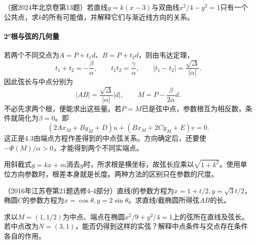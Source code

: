 \par\noindent\begin{minipage}{\linewidth}
\begin{example}
（据2024年北京卷第13题）若直线\(y=k(x-3)\)与双曲线\(x^2/4-y^2=1\)只有一个公共点，求\(k\)的所有可能值，并解释它们与渐近线方向的关系。
\end{example}
\end{minipage}\par


\paragraph{2°根与弦的几何量} \mbox{}

若两个不同交点为\(A=P+t_1d\)、\(B=P+t_2d\)，则由韦达定理，
\begin{equation*}
    t_1+t_2=-\frac\beta\alpha,\qquad
    t_1t_2=\frac\gamma\alpha,\qquad
    |t_1-t_2|=\frac{\sqrt\Delta}{|\alpha|} .
\end{equation*}
因此弦长与中点分别为
\begin{equation}\label{eq:quadratic-chord-length-midpoint}
    |AB|=\frac{\sqrt\Delta}{|\alpha|}|d|,
    \qquad M=P-\frac\beta{2\alpha}d .
\end{equation}
不必先求两个根，便能求出这些量。若\(P=M\)已是弦中点，参数根互为相反数，条件就简化为\(\beta=0\)。即
\begin{equation}\label{eq:quadratic-midpoint-chord-condition}
    (2Ax_M+By_M+D)u+(Bx_M+2Cy_M+E)v=0 .
\end{equation}
这正是4.3由端点方程作差得到的中点弦关系。方向确定后，还要使\(-\Phi(M)/\alpha>0\)，才能得到两个不同实端点。

用斜截式\(y=kx+m\)消去\(y\)时，所求根是横坐标，故弦长应乘以\(\sqrt{1+k^2}\)。使用单位方向参数时，根差本身就是长度。两种方法的区别只在参数的尺度。

\par\noindent\begin{minipage}{\linewidth}
\begin{example}
（2016年江苏卷第21题选修4-4部分）直线\(l\)的参数方程为\(x=1+t/2,y=\sqrt3t/2\)，椭圆\(C\)的参数方程为\(x=\cos\theta,y=2\sin\theta\)。求直线\(l\)截椭圆所得弦\(AB\)的长。
\end{example}
\end{minipage}\par


\par\noindent\begin{minipage}{\linewidth}
\begin{example}
求以\(M=(1,1/2)\)为中点、端点在椭圆\(x^2/9+y^2/4=1\)上的弦所在直线及弦长。若中点改为\(N=(3,1)\)，能否仍得到这样的实弦？解释中点条件与交点存在条件各自的作用。
\end{example}
\end{minipage}\par


